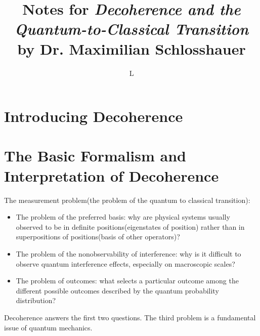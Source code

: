 \documentclass{article}
\title{Notes for \textsl{Decoherence and the
Quantum-to-Classical Transition} by Dr. Maximilian Schlosshauer}
\author{L}
\begin{document}
\maketitle
\section{Introducing Decoherence}

\section{The Basic Formalism and Interpretation of Decoherence}

The measurement problem(the problem of the quantum to classical transition):
\begin{itemize}
    \item The problem of the preferred basis: why are physical systems usually 
    observed to be in definite positions(eigenstates of position) rather than
    in superpositions of positions(basis of other operators)?
    \item The problem of the nonobservability of interference: why is it 
    difficult to observe quantum interference effects, especially on macroscopic
    scales?
    \item The problem of outcomes: what selects a particular outcome among the
    different possible outcomes described by the quantum probability distribution?
\end{itemize}
Decoherence answers the first two questions. The third problem is a fundamental
issue of quantum mechanics.
\end{document}
